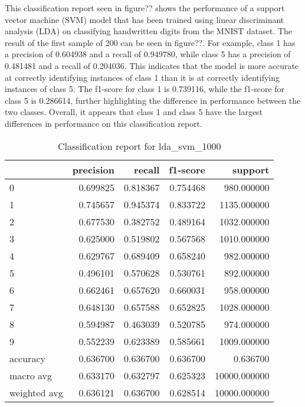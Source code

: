 This classification report seen in figure?? shows the performance of a support vector machine (SVM) model that has been trained using linear discriminant analysis (LDA) on classifying handwritten digits from the MNIST dataset. The result of the first sample of 200 can be seen in figure??. For example, class 1 has a precision of 0.604938 and a recall of 0.949780, while class 5 has a precision of 0.481481 and a recall of 0.204036. This indicates that the model is more accurate at correctly identifying instances of class 1 than it is at correctly identifying instances of class 5. The f1-score for class 1 is 0.739116, while the f1-score for class 5 is 0.286614, further highlighting the difference in performance between the two classes. Overall, it appears that class 1 and class 5 have the largest differences in performance on this classification report.

\begin{table}[htb!]
    \centering
    \caption{Classification report for lda_svm_1000}
    \label{tab:classification-report-lda_svm_1000}
    \begin{tabular}{lrrrr}
    \toprule
     & precision & recall & f1-score & support \\
    \midrule
    0 & 0.699825 & 0.818367 & 0.754468 & 980.000000 \\
    1 & 0.745657 & 0.945374 & 0.833722 & 1135.000000 \\
    2 & 0.677530 & 0.382752 & 0.489164 & 1032.000000 \\
    3 & 0.625000 & 0.519802 & 0.567568 & 1010.000000 \\
    4 & 0.629767 & 0.689409 & 0.658240 & 982.000000 \\
    5 & 0.496101 & 0.570628 & 0.530761 & 892.000000 \\
    6 & 0.662461 & 0.657620 & 0.660031 & 958.000000 \\
    7 & 0.648130 & 0.657588 & 0.652825 & 1028.000000 \\
    8 & 0.594987 & 0.463039 & 0.520785 & 974.000000 \\
    9 & 0.552239 & 0.623389 & 0.585661 & 1009.000000 \\
    accuracy & 0.636700 & 0.636700 & 0.636700 & 0.636700 \\
    macro avg & 0.633170 & 0.632797 & 0.625323 & 10000.000000 \\
    weighted avg & 0.636121 & 0.636700 & 0.628514 & 10000.000000 \\
    \bottomrule
    \end{tabular}
    \end{table}

